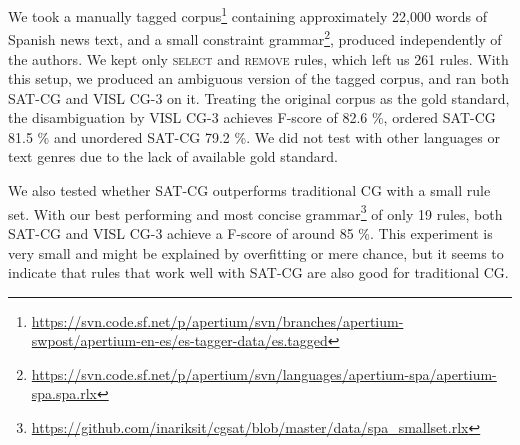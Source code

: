 We took a manually tagged
corpus\footnote{\url{https://svn.code.sf.net/p/apertium/svn/branches/apertium-swpost/apertium-en-es/es-tagger-data/es.tagged}}
containing approximately 22,000 words of Spanish news text, 
and a small constraint grammar\footnote{\url{https://svn.code.sf.net/p/apertium/svn/languages/apertium-spa/apertium-spa.spa.rlx}}, produced independently of the authors.
We kept only \textsc{select} and \textsc{remove} rules, which left us 261 rules.
With this setup, we produced an ambiguous version of the tagged
corpus, and ran both SAT-CG and VISL CG-3 on it.
Treating the original corpus as the gold standard, the disambiguation
by  VISL CG-3 achieves F-score of 82.6 \%, ordered SAT-CG 81.5 \%  and
unordered SAT-CG 79.2 \%. 
We did not test with other languages or text genres due to the lack of
available gold standard.

We also tested whether SAT-CG outperforms traditional CG with a
small rule set. With our best performing and most concise
grammar\footnote{\url{https://github.com/inariksit/cgsat/blob/master/data/spa\_smallset.rlx}}
of only 19 rules, both SAT-CG and VISL CG-3  achieve a F-score of
around 85 \%. This experiment is very small and might be explained by
overfitting or mere chance, but it seems to indicate that rules that
work well with SAT-CG are also good for traditional CG.





